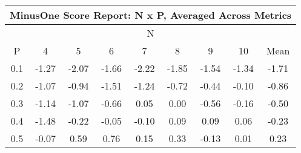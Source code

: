 \documentclass[11pt,a4paper]{report}
\begin{document}

\begin{centering}
\begin{longtable}{ | c || c | c | c | c | c | c | c || c |}
\hline
\multicolumn{9}{|c|}{ MinusOne Score Report: N x P, Averaged Across Metrics } \\
\hline
\multicolumn{9}{|c|}{ N } \\
\hline
P & 4 & 5 & 6 & 7 & 8 & 9 & 10 & Mean\\
\hline
\hline
0.1 &  \cellcolor[HTML]{FFDFDF} -1.27 &  \cellcolor[HTML]{FFC7C7} -2.07 &  \cellcolor[HTML]{FFD7D7} -1.66 &  \cellcolor[HTML]{FFC7C7} -2.22 &  \cellcolor[HTML]{FFCFCF} -1.85 &  \cellcolor[HTML]{FFD7D7} -1.54 &  \cellcolor[HTML]{FFDFDF} -1.34 &  \cellcolor[HTML]{FFD7D7} -1.71 \\
0.2 &  \cellcolor[HTML]{FFE7E7} -1.07 &  \cellcolor[HTML]{FFE7E7} -0.94 &  \cellcolor[HTML]{FFD7D7} -1.51 &  \cellcolor[HTML]{FFDFDF} -1.24 &  \cellcolor[HTML]{FFEFEF} -0.72 &  \cellcolor[HTML]{FFF7F7} -0.44 &  \cellcolor[HTML]{FFFFFF} -0.10 &  \cellcolor[HTML]{FFE7E7} -0.86 \\
0.3 &  \cellcolor[HTML]{FFDFDF} -1.14 &  \cellcolor[HTML]{FFE7E7} -1.07 &  \cellcolor[HTML]{FFEFEF} -0.66 &  \cellcolor[HTML]{FFFFFF} 0.05 &  \cellcolor[HTML]{FFFFFF} 0.00 &  \cellcolor[HTML]{FFEFEF} -0.56 &  \cellcolor[HTML]{FFFFFF} -0.16 &  \cellcolor[HTML]{FFEFEF} -0.50 \\
0.4 &  \cellcolor[HTML]{FFD7D7} -1.48 &  \cellcolor[HTML]{FFF7F7} -0.22 &  \cellcolor[HTML]{FFFFFF} -0.05 &  \cellcolor[HTML]{FFFFFF} -0.10 &  \cellcolor[HTML]{FFFFFF} 0.09 &  \cellcolor[HTML]{FFFFFF} 0.09 &  \cellcolor[HTML]{FFFFFF} 0.06 &  \cellcolor[HTML]{FFF7F7} -0.23 \\
0.5 &  \cellcolor[HTML]{FFFFFF} -0.07 &  \cellcolor[HTML]{EFEFFF} 0.59 &  \cellcolor[HTML]{EFEFFF} 0.76 &  \cellcolor[HTML]{FFFFFF} 0.15 &  \cellcolor[HTML]{F7F7FF} 0.33 &  \cellcolor[HTML]{FFFFFF} -0.13 &  \cellcolor[HTML]{FFFFFF} 0.01 &  \cellcolor[HTML]{F7F7FF} 0.23 \\

\end{longtable}
\end{centering}
\end{document}
